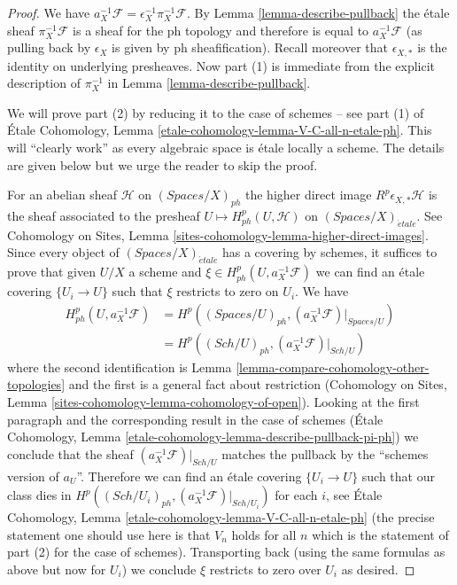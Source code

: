 \documentclass{stacks-project}
\theoremstyle{plain}
\theoremstyle{definition}
\theoremstyle{remark}
\numberwithin{equation}{subsection}
\def\Sch{\mathit{Sch}}
\def\etale{{\acute{e}tale}}
\begin{document}
\begin{proof}
We have $a_X^{-1}\mathcal{F} = \epsilon_X^{-1} \pi_X^{-1}\mathcal{F}$.
By Lemma \ref{lemma-describe-pullback} the \'etale sheaf
$\pi_X^{-1}\mathcal{F}$ is a sheaf for the ph topology
and therefore is equal to $a_X^{-1}\mathcal{F}$ (as pulling
back by $\epsilon_X$ is given by ph sheafification).
Recall moreover that $\epsilon_{X, *}$ is the identity
on underlying presheaves.
Now part (1) is immediate from the explicit description of $\pi_X^{-1}$
in Lemma \ref{lemma-describe-pullback}.

\medskip\noindent
We will prove part (2) by reducing it to the case of schemes --
see part (1) of
\'Etale Cohomology, Lemma \ref{etale-cohomology-lemma-V-C-all-n-etale-ph}.
This will ``clearly work'' as every algebraic space is
\'etale locally a scheme. The details are given below but we urge
the reader to skip the proof.

\medskip\noindent
For an abelian sheaf $\mathcal{H}$ on $(\textit{Spaces}/X)_{ph}$ the
higher direct image $R^p\epsilon_{X, *}\mathcal{H}$ is the sheaf
associated to the presheaf $U \mapsto H^p_{ph}(U, \mathcal{H})$
on $(\textit{Spaces}/X)_\etale$. See
Cohomology on Sites, Lemma \ref{sites-cohomology-lemma-higher-direct-images}.
Since every object of $(\textit{Spaces}/X)_\etale$ has a covering
by schemes, it suffices to prove that given $U/X$ a scheme and
$\xi \in H^p_{ph}(U, a_X^{-1}\mathcal{F})$ we can find
an \'etale covering $\{U_i \to U\}$ such that $\xi$
restricts to zero on $U_i$. We have
\begin{align*}
H^p_{ph}(U, a_X^{-1}\mathcal{F})
& =
H^p((\textit{Spaces}/U)_{ph}, (a_X^{-1}\mathcal{F})|_{\textit{Spaces}/U}) \\
& =
H^p((\Sch/U)_{ph}, (a_X^{-1}\mathcal{F})|_{\Sch/U})
\end{align*}
where the second identification is
Lemma \ref{lemma-compare-cohomology-other-topologies}
and the first is a general fact about restriction
(Cohomology on Sites, Lemma \ref{sites-cohomology-lemma-cohomology-of-open}).
Looking at the first paragraph and the corresponding result in the
case of schemes (\'Etale Cohomology, Lemma
\ref{etale-cohomology-lemma-describe-pullback-pi-ph})
we conclude that the sheaf $(a_X^{-1}\mathcal{F})|_{\Sch/U}$
matches the pullback by the ``schemes version of $a_U$''.
Therefore we can find an \'etale covering
$\{U_i \to U\}$ such that our class dies in
$H^p((\Sch/U_i)_{ph}, (a_X^{-1}\mathcal{F})|_{\Sch/U_i})$
for each $i$, see
\'Etale Cohomology, Lemma \ref{etale-cohomology-lemma-V-C-all-n-etale-ph}
(the precise statement one should use here is that $V_n$ holds for all $n$
which is the statement of part (2) for the case of schemes).
Transporting back (using the same formulas as above but now for
$U_i$) we conclude $\xi$ restricts to zero over $U_i$ as desired.
\end{proof}
\end{document}

